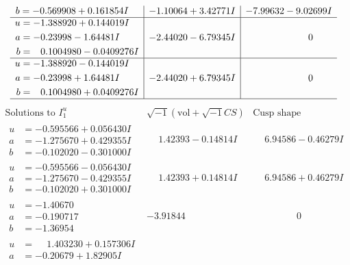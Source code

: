 \documentclass[1p]{elsarticle_modified}
\theoremstyle{definition}
\newcommand{\I}{\sqrt{-1}}
\begin{document}
$$\begin{array}{c|c|c}
\begin{aligned}
b &= -0.569908 + 0.161854 I\end{aligned}
 & -1.10064 + 3.42771 I & -7.99632 - 9.02699 I \\ \hline\begin{aligned}
u &= -1.388920 + 0.144019 I \\
a &= -0.23998 - 1.64481 I \\
b &= \phantom{-}0.1004980 - 0.0409276 I\end{aligned}
 & -2.44020 - 6.79345 I & \phantom{-0.000000 } 0 \\ \hline\begin{aligned}
u &= -1.388920 - 0.144019 I \\
a &= -0.23998 + 1.64481 I \\
b &= \phantom{-}0.1004980 + 0.0409276 I\end{aligned}
 & -2.44020 + 6.79345 I & \phantom{-0.000000 } 0\\
 \hline 
 \end{array}$$\newpage$$\begin{array}{c|c|c}  
\text{Solutions to }I^u_{1}& \I (\text{vol} + \sqrt{-1}CS) & \text{Cusp shape}\\
 \hline 
\begin{aligned}
u &= -0.595566 + 0.056430 I \\
a &= -1.275670 + 0.429355 I \\
b &= -0.102020 - 0.301000 I\end{aligned}
 & \phantom{-}1.42393 - 0.14814 I & \phantom{-}6.94586 - 0.46279 I \\ \hline\begin{aligned}
u &= -0.595566 - 0.056430 I \\
a &= -1.275670 - 0.429355 I \\
b &= -0.102020 + 0.301000 I\end{aligned}
 & \phantom{-}1.42393 + 0.14814 I & \phantom{-}6.94586 + 0.46279 I \\ \hline\begin{aligned}
u &= -1.40670\phantom{ +0.000000I} \\
a &= -0.190717\phantom{ +0.000000I} \\
b &= -1.36954\phantom{ +0.000000I}\end{aligned}
 & -3.91844\phantom{ +0.000000I} & \phantom{-0.000000 } 0 \\ \hline\begin{aligned}
u &= \phantom{-}1.403230 + 0.157306 I \\
a &= -0.20679 + 1.82905 I \\

\end{aligned}
\end{array}$$
\end{document}
